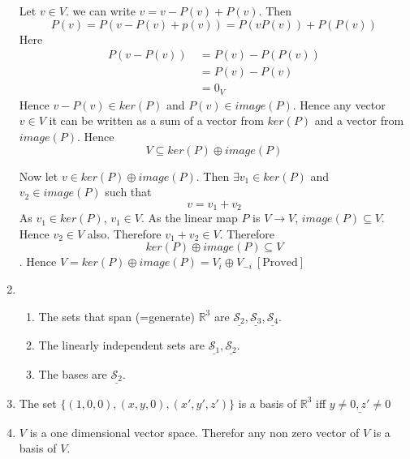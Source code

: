 \documentclass{article}
\newcommand{\mS}{\mathcal{S}}
\begin{document}
\begin{enumerate}
	      \hspace{1cm} Let $v\in V$. we can write $v=v-P(v)+P(v)$. Then $$P(v)=P(v-P(v)+p(v))=P(vP(v))+P(P(v))$$Here \begin{align*}
		      P(v-P(v))\  & =P(v)-P(P(v)) \\
		                  & =P(v)-P(v)    \\
		                  & =0_V
	      \end{align*}Hence $v-P(v)\in ker(P)$ and $P(v)\in image(P)$. Hence any vector $v\in V$ it can be written as a sum of a vector from $ker(P)$ and a vector from $image(P)$. Hence $$V\subseteq ker(P)\oplus image(P)$$

	      \hspace{1cm}Now let $v\in ker(P)\oplus image(P)$. Then $\exists v_1\in ker(P)$ and $v_2\in image(P)$ such that $$v=v_1+v_2$$As $v_1\in ker(P)$, $v_1\in V$. As the linear map $P$ is $V\to V$, $image(P)\subseteq V$. Hence $v_2\in V$ also. Therefore $v_1+v_2\in V$. Therefore$$ker(P)\oplus image(P)\subseteq V$$. Hence $V=ker(P)\oplus image(P)=V_i\oplus V_{-i}\ [\text{Proved}]$



	\item \begin{enumerate}
		      \item The sets that span (=generate) $\mathbb{R}^3$ are $\underline{\mS_2},\underline{\mS_3},\underline{\mS_4}$.
		      \item The linearly independent sets are $\underline{\mS_1},\underline{\mS_2}$.
		      \item The bases are $\underline{\mS_2}$.
	      \end{enumerate}
	\item The set $\{(1,0,0),(x,y,0),(x',y',z')\}$ is a basis of $\mathbb{R}^3$ iff $\underline{y\neq0, z'\neq 0}$
	\item $V$ is a one dimensional vector space. Therefor any non zero vector of $V$ is a basis of $V$.
\end{enumerate}
\end{document}
